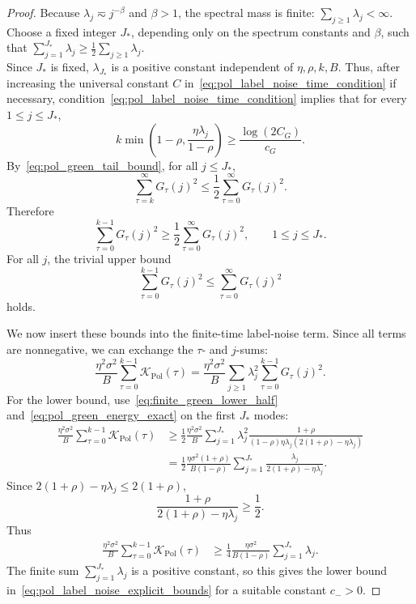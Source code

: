 \begin{proof}
Because $\lambda_j\eqsim j^{-\beta}$ and $\beta>1$, the spectral mass is finite:
$\sum_{j\ge1}\lambda_j<\infty.$\\
Choose a fixed integer $J_*$, depending only on the spectrum constants and $\beta$, such that
$\sum_{j=1}^{J_*}\lambda_j\ge\frac12\sum_{j\ge1}\lambda_j.$\\
Since $J_*$ is fixed, $\lambda_{J_*}$ is a positive constant independent of $\eta,\rho,k,B$. Thus, after increasing the universal constant $C$ in~\eqref{eq:pol_label_noise_time_condition} if necessary, condition~\eqref{eq:pol_label_noise_time_condition} implies that for every $1\le j\le J_*$,
\[
    k\min\left(1-\rho,\frac{\eta\lambda_j}{1-\rho}\right)
    \ge
    \frac{\log(2C_G)}{c_G}.
\]
By~\eqref{eq:pol_green_tail_bound}, for all $j\le J_*$,
\[
    \sum_{\tau=k}^{\infty}G_\tau(j)^2
    \le
    \frac12\sum_{\tau=0}^{\infty}G_\tau(j)^2.
\]
Therefore
\begin{equation}
\label{eq:finite_green_lower_half}
    \sum_{\tau=0}^{k-1}G_\tau(j)^2
    \ge
    \frac12\sum_{\tau=0}^{\infty}G_\tau(j)^2,
    \qquad 1\le j\le J_*.
\end{equation}
For all $j$, the trivial upper bound
\begin{equation}
\label{eq:finite_green_upper_saturated}
    \sum_{\tau=0}^{k-1}G_\tau(j)^2
    \le
    \sum_{\tau=0}^{\infty}G_\tau(j)^2
\end{equation}
holds.

We now insert these bounds into the finite-time label-noise term. Since all terms are nonnegative, we can exchange the $\tau$- and $j$-sums:
\[
    \frac{\eta^2\sigma^2}{B}\sum_{\tau=0}^{k-1}\mathcal K_{\mathrm{Pol}}(\tau)
    =
    \frac{\eta^2\sigma^2}{B}
    \sum_{j\ge1}\lambda_j^2\sum_{\tau=0}^{k-1}G_\tau(j)^2.
\]
For the lower bound, use~\eqref{eq:finite_green_lower_half} and~\eqref{eq:pol_green_energy_exact} on the first $J_*$ modes:
\begin{align*}
    \frac{\eta^2\sigma^2}{B}\sum_{\tau=0}^{k-1}\mathcal K_{\mathrm{Pol}}(\tau)
    &\ge
    \frac12\frac{\eta^2\sigma^2}{B}
    \sum_{j=1}^{J_*}\lambda_j^2
    \frac{1+\rho}{(1-\rho)\eta\lambda_j(2(1+\rho)-\eta\lambda_j)} \\
    &=
    \frac12\frac{\eta\sigma^2(1+\rho)}{B(1-\rho)}
    \sum_{j=1}^{J_*}\frac{\lambda_j}{2(1+\rho)-\eta\lambda_j}.
\end{align*}
Since $2(1+\rho)-\eta\lambda_j\le2(1+\rho)$,
\[
    \frac{1+\rho}{2(1+\rho)-\eta\lambda_j}\ge \frac12.
\]
Thus
\begin{align*}
    \frac{\eta^2\sigma^2}{B}\sum_{\tau=0}^{k-1}\mathcal K_{\mathrm{Pol}}(\tau)
    &\ge
    \frac14\frac{\eta\sigma^2}{B(1-\rho)}
    \sum_{j=1}^{J_*}\lambda_j.
\end{align*}
The finite sum $\sum_{j=1}^{J_*}\lambda_j$ is a positive constant, so this gives the lower bound in~\eqref{eq:pol_label_noise_explicit_bounds} for a suitable constant $c_->0$.


\end{proof}
